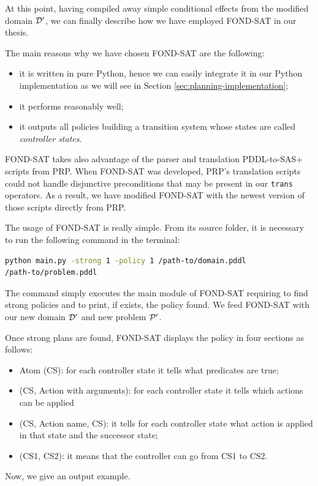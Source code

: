 At this point, having compiled away simple conditional effects from the modified domain $\D'$, we can finally describe how we have employed FOND-SAT in our thesis.

The main reasons why we have chosen FOND-SAT are the following:
\begin{itemize}
\item it is written in pure Python, hence we can easily integrate it in our Python implementation as we will see in Section \ref{sec:planning-implementation};
\item it performs reasonably well;
\item it outputs all policies building a transition system whose states are called \textit{controller states}.
\end{itemize}
FOND-SAT takes also advantage of the parser and translation PDDL-to-SAS+ scripts from  PRP. When FOND-SAT was developed, PRP's translation scripts could not handle disjunctive preconditions that may be present in our \texttt{trans} operators. As a result, we have modified FOND-SAT with the newest version of those scripts directly from PRP.

The usage of FOND-SAT is really simple. From its source folder, it is necessary to run the following command in the terminal:
\begin{lstlisting}[language=bash]
python main.py -strong 1 -policy 1 /path-to/domain.pddl 
/path-to/problem.pddl
\end{lstlisting}
The command simply executes the main module of FOND-SAT requiring to find strong policies and to print, if exists, the policy found. We feed FOND-SAT with our new domain $\D'$ and new problem $\P'$.

Once strong plans are found, FOND-SAT displays the policy in four sections as follows:
\begin{itemize}
\item Atom (CS): for each controller state it tells what predicates are true;
\item (CS, Action with arguments): for each controller state it tells which actions can be applied
\item (CS, Action name, CS): it tells for each controller state what action is applied in that state and the successor state;
\item (CS1, CS2): it means that the controller can go from CS1 to CS2. 
\end{itemize}
Now, we give an output example.

